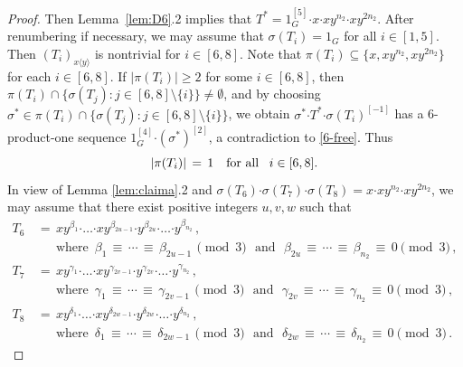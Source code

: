 \documentclass[leqno,a4paper]{amsart}
\def\bd{{\boldsymbol{\cdot}}}
\theoremstyle{plain}
\theoremstyle{definition}
\numberwithin{equation}{section}
\begin{document}
\begin{proof}
        Then Lemma~\ref{lem:D6}.2 implies that $T^* = 1_{G}^{[5]} \bd x \bd xy^{n_2} \bd xy^{2n_2}$. After renumbering if necessary, we may assume that $\sigma(T_i) = 1_G$ for all $i\in [1,5]$.
        Then $(T_i)_{x\langle y\rangle}$ is nontrivial for $i \in [6,8]$.
        Note that $\pi (T_i) \subseteq \{ x, xy^{n_2}, xy^{2n_2} \}$ for each $i \in [6,8]$. If $|\pi (T_i)| \ge 2$ for some $i \in [6,8]$, then $\pi (T_i)\cap \big\{ \sigma (T_j) \colon j\in [6,8]\setminus \{i\} \big\} \neq \emptyset$, and by choosing $\sigma^*\in \pi(T_i)\cap \big\{ \sigma (T_j)\colon j\in [6,8]\setminus \{i\} \big\}$,  we obtain  $\sigma^*\bd T^*\bd \sigma(T_i)^{[-1]}$ has a 6-product-one sequence $1_G^{[4]}\bd (\sigma^*)^{[2]}$, a contradiction to \eqref{6-free}.
        Thus
        \begin{equation}\label{sig}
        \text{ $| \pi (T_i)| \, = \, 1$ \,\, for all \, $i \in [6,8]$. }
        \end{equation}
         In view of  Lemma \ref{lem:claima}.2 and $\sigma(T_6)\bd \sigma(T_7)\bd \sigma(T_8)=x \bd xy^{n_2} \bd xy^{2n_2}$, we may assume that there exist positive integers $u,v,w$ such that
        \begin{equation} \label{eq:mod3}
		\begin{aligned}
			T_6 \, & = \, xy^{\beta_1} \bd \ldots \bd xy^{\beta_{2u-1}} \bd y^{\beta_{2u}} \bd \ldots \bd y^{\beta_{n_2}} \,, \\
			       & \quad \, \text{ where } \, \beta_1 \, \equiv \, \cdots \, \equiv \, \beta_{2u-1}  \, \pmod 3 \,\, \text{ and } \,\, \beta_{2u} \, \equiv \, \cdots \, \equiv \, \beta_{n_2} \, \equiv \, 0 \pmod 3 \,, \\
			T_7 \, & = \, xy^{\gamma_1} \bd \ldots \bd xy^{\gamma_{2v-1}} \bd y^{\gamma_{2v}} \bd \ldots \bd y^{\gamma_{n_2}} \,, \\
			       & \quad \, \text{ where } \, \gamma_1 \, \equiv \, \cdots \, \equiv \, \gamma_{2v-1} \,  \pmod 3 \,\, \text{ and } \,\, \gamma_{2v} \, \equiv \, \cdots \, \equiv \, \gamma_{n_2} \, \equiv \, 0 \pmod 3 \,, \\
			T_8 \, & = \, xy^{\delta_1} \bd \ldots \bd xy^{\delta_{2w-1}} \bd y^{\delta_{2w}} \bd \ldots \bd y^{\delta_{n_2}} \,, \\
			       & \quad \, \text{ where } \, \delta_1 \, \equiv \, \cdots \, \equiv \, \delta_{2w-1} \,  \pmod 3 \,\, \text{ and } \,\, \delta_{2w} \, \equiv \, \cdots \, \equiv \, \delta_{n_2} \, \equiv \,  0 \pmod 3 \,.
		\end{aligned}
        \end{equation}

\end{proof}
\end{document}
